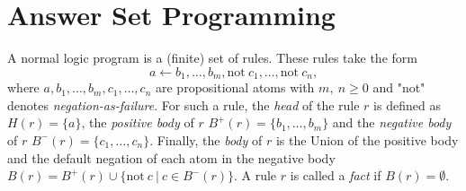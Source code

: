 \section{Answer Set Programming}
\label{sec:Preliminaries on answer set programming/Answer Set Programming}
A normal logic program is a (finite) set of rules. These rules take the form
\[
    a \leftarrow b_1, \ldots , b_m, \text{not}\ c_1, \ldots , \text{not}\ c_n,
\]
where \(a, b_1, \ldots , b_m, c_1, \ldots ,c_n\) are propositional atoms with \(m,\ n \geq 0\) and "not" denotes \emph{negation-as-failure}. For such a rule, the \emph{head} of the rule $r$ is defined as \(H(r) = \{a\}\), the \emph{positive body} of $r$ \(B^+(r) = \{ b_1, \ldots , b_m\}\) and the \emph{negative body} of $r$ \(B^-(r) = \{c_1, \ldots ,c_n\}\). Finally, the \emph{body} of $r$ is the Union of the positive body and the default negation of each atom in the negative body \(B(r) = B^+(r) \cup \{\text{not}\ c\ |\ c \in B^-(r)\}\). A rule $r$ is called a \emph{fact} if \(B(r) = \emptyset\).

